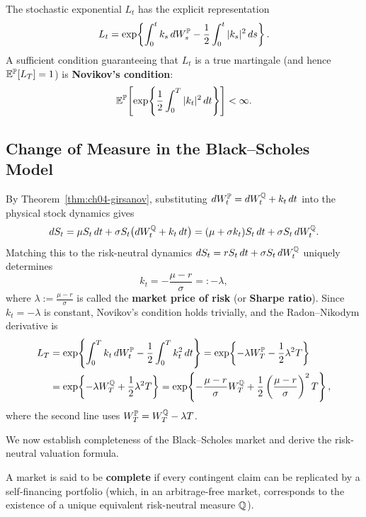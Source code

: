 \begin{note}
    The stochastic exponential $L_t$ has the explicit representation
    \[
        L_t = \exp\!\left\{\int_0^t k_s\,dW_s^{\mathbb{P}} - \frac{1}{2}\int_0^t |k_s|^2\,ds\right\}.
    \]
    A sufficient condition guaranteeing that $L_t$ is a true martingale (and hence $\mathbb{E}^{\mathbb{P}}[L_T] = 1$) is \textbf{Novikov's condition}:
    \[
        \mathbb{E}^{\mathbb{P}}\!\left[\exp\!\left\{\frac{1}{2}\int_0^T |k_t|^2\,dt\right\}\right] < \infty.
    \]
\end{note}

\subsection{Change of Measure in the Black--Scholes Model}
By Theorem~\ref{thm:ch04-girsanov}, substituting $dW_t^{\mathbb{P}} = dW_t^{\mathbb{Q}} + k_t\,dt$ into the physical stock dynamics gives
\[
    dS_t = \mu S_t\,dt + \sigma S_t\bigl(dW_t^{\mathbb{Q}} + k_t\,dt\bigr)
    = (\mu + \sigma k_t) S_t\,dt + \sigma S_t\,dW_t^{\mathbb{Q}}.
\]
Matching this to the risk-neutral dynamics $dS_t = r S_t\,dt + \sigma S_t\,dW_t^{\mathbb{Q}}$ uniquely determines
\[
    k_t = -\frac{\mu - r}{\sigma} =: -\lambda,
\]
where $\lambda := \frac{\mu - r}{\sigma}$ is called the \textbf{market price of risk} (or \textbf{Sharpe ratio}). Since $k_t = -\lambda$ is constant, Novikov's condition holds trivially, and the Radon--Nikodym derivative is
\begin{align*}
    L_T
    &= \exp\!\left\{\int_0^T k_t\,dW_t^{\mathbb{P}} - \frac{1}{2}\int_0^T k_t^2\,dt\right\}
    = \exp\!\left\{-\lambda W_T^{\mathbb{P}} - \frac{1}{2}\lambda^2 T\right\} \\
    &= \exp\!\left\{-\lambda W_T^{\mathbb{Q}} + \frac{1}{2}\lambda^2 T\right\}
    = \exp\!\left\{-\frac{\mu - r}{\sigma} W_T^{\mathbb{Q}} + \frac{1}{2}\left(\frac{\mu - r}{\sigma}\right)^2 T\right\},
\end{align*}
where the second line uses $W_T^{\mathbb{P}} = W_T^{\mathbb{Q}} - \lambda T$.

We now establish completeness of the Black--Scholes market and derive the risk-neutral valuation formula.

\begin{definition}
    \label{def:ch04-complete}
    A market is said to be \textbf{complete} if every contingent claim can be replicated by a self-financing portfolio (which, in an arbitrage-free market, corresponds to the existence of a unique equivalent risk-neutral measure $\mathbb{Q}$).
\end{definition}

